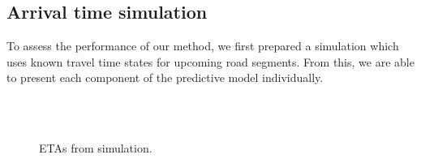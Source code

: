 \subsection{Arrival time simulation}
\label{sec:arrival_simulation}

To assess the performance of our method, we first prepared a simulation which uses known travel time states for upcoming road segments. From this, we are able to present each component of the predictive model individually.


\begin{knitrout}\small
{}\color{fgcolor}\begin{figure}

{\centering {}\\
\\

}

\caption[ETAs from simulation]{ETAs from simulation.}\label{fig:arrival_simulation}
\end{figure}


\end{knitrout}
